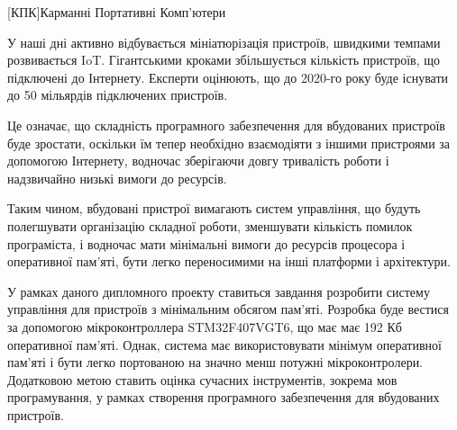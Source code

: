 \documentclass[main.tex]{subfiles}
\begin{document}
\begin{acronym}


  [КПК]{Карманні Портативні Комп'ютери}
\end{acronym}


У наші дні активно відбувається мініатюрізація пристроїв, швидкими темпами розвивається \ac{IoT}. Гігантськими кроками збільшується кількість пристроїв, що підключені до Інтернету. Експерти оцінюють, що до 2020-го року буде існувати до 50 мільярдів підключених пристроїв\cite{dave-evans:IoT}.

Це означає, що складність програмного забезпечення для вбудованих пристроїв буде зростати, оскільки їм тепер необхідно взаємодіяти з іншими пристроями за допомогою Інтернету, водночас зберігаючи довгу тривалість роботи і надзвичайно низькі вимоги до ресурсів.

Таким чином, вбудовані пристрої вимагають систем управління, що будуть полегшувати організацію складної роботи, зменшувати кількість помилок програміста, і водночас мати мінімальні вимоги до ресурсів процесора і оперативної пам'яті, бути легко переносимими на інші платформи і архітектури.

У рамках даного дипломного проекту ставиться завдання розробити систему управління для пристроїв з мінімальним обсягом пам'яті. Розробка буде вестися за допомогою мікроконтроллера STM32F407VGT6, що має має 192 Кб оперативної пам'яті. Однак, система має використовувати мінімум оперативної пам'яті і бути легко портованою на значно менш потужні мікроконтролери. Додатковою метою ставить оцінка сучасних інструментів, зокрема мов програмування, у рамках створення програмного забезпечення для вбудованих пристроїв.
\end{document}
